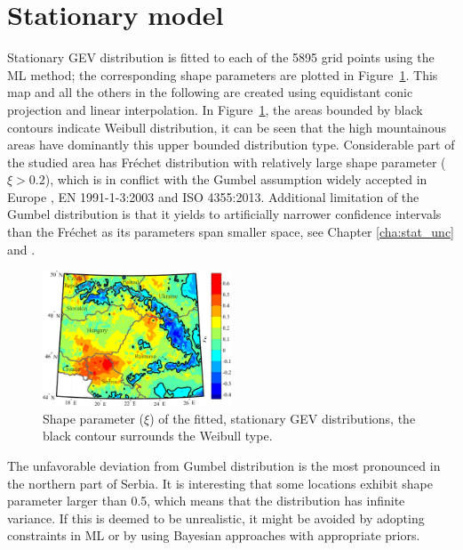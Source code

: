\section{Stationary model}
Stationary GEV distribution is fitted to each of the 5895 grid points using the ML method; the corresponding shape parameters are plotted in Figure~\ref{fig:shape_map}. This map and all the others in the following are created using equidistant conic projection and linear interpolation. In Figure~\ref{fig:shape_map}, the areas bounded by black contours indicate Weibull distribution, it can be seen that the high mountainous areas have dominantly this upper bounded distribution type. Considerable part of the studied area has Fréchet distribution with relatively large shape parameter ($\xi > 0.2$), which is in conflict with the Gumbel assumption widely accepted in Europe \citep{Sanpaolesi1998}, EN 1991-1-3:2003 and ISO 4355:2013. Additional limitation of the Gumbel distribution is that it yields to artificially narrower confidence intervals than the Fréchet as its parameters span smaller space, see Chapter \ref{cha:stat_unc} and \citet{Coles2003catastrophes}.

\begin{figure}[htbp!]
	\centering    
	\includegraphics[width=0.5\textwidth]{stat_shape_parameter_map_crude_names.jpg}
	\caption{Shape parameter ($\xi$) of the fitted, stationary GEV distributions, the black contour surrounds the Weibull type.}
	\label{fig:shape_map}
\end{figure}

The unfavorable deviation from Gumbel distribution is the most pronounced in the northern part of Serbia. It is interesting that some locations exhibit shape parameter larger than 0.5, which means that the distribution has infinite variance. If this is deemed to be unrealistic, it might be avoided by adopting constraints in ML or by using Bayesian approaches with appropriate priors.

